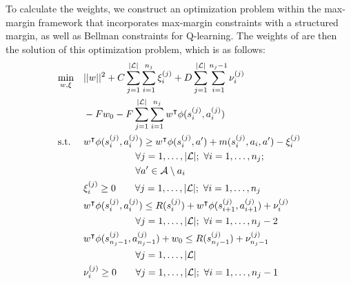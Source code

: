 To calculate the weights, we construct an optimization problem within the
max-margin framework that incorporates max-margin constraints with a structured
margin, as well as Bellman constraints for Q-learning. The weights of \approxq{}
are then the solution of this optimization problem, which is as follows:
\begin{align}
& \underset{w, \xi}{\text{min}}  & & ||\weights{}||^2 + \marginslackc{} \sum_{j=1}^{\labelsetsize{}} \sum_{i=1}^{\nsub{j}} \marginslacksubsup{i}{(j)}
                                                      + \bellmanslackc{} \sum_{j=1}^{\labelsetsize{}} \sum_{i=1}^{\nsub{j} - 1} \bellmanslacksubsup{i}{(j)} \notag \\
&    & & - \bellmanc{} \weightszero{} - \bellmanc{} \sum_{j=1}^{\labelsetsize{}} \sum_{i=1}^{\nsub{j}} \weightst{}\features{\statesubsup{i}{(j)}}{\actionsubsup{i}{(j)}}\\
& \text{s.t.} & &\weightst{} \features{\statesubsup{i}{(j)}}{\actionsubsup{i}{(j)}} \geq \weightst{} \phi(\statesubsup{i}{(j)}, \actionvar{}') + \marginvar{}(\statesubsup{i}{(j)}, \actionsub{i}, \actionvar{}') - \marginslacksubsup{i}{(j)} \notag\\
    &&&\hspace{1.9cm}\forall j = 1, \ldots, \labelsetsize{}; \text{ } \forall i = 1, \ldots, \nsub{j}; \notag\\
    &&&\hspace{1.9cm}\forall \actionvar{}' \in \actionset{}\setminus \actionvar{}_i  \label{eq:margin_constr}\\
&    & & \marginslacksubsup{i}{(j)} \geq 0 \hspace{0.7cm} \forall j = 1, \ldots, \labelsetsize{}; \text{ } \forall i = 1, \ldots, \nsub{j} \label{eq:margin_slacks}\\
&    & & \weightst{}\features{\statesubsup{i}{(j)}}{\actionsubsup{i}{(j)}} \leq \rewardfn{}(\statesubsup{i}{(j)}) + \weightst{}\features{\statesubsup{i+1}{(j)}}{\actionsubsup{i+1}{(j)}} + \bellmanslacksubsup{i}{(j)} \notag \\
    &&&\hspace{1.9cm} \forall j = 1, \ldots, \labelsetsize{}; \text{ } \forall i = 1, \ldots, \nsub{j} - 2 \label{eq:bellman_constr}\\
&    & & \weightst{}\features{\statesubsup{\nsub{j}-1}{(j)}}{\actionsubsup{\nsub{j}-1}{(j)}} + \weightszero \leq \rewardfn{}(\statesubsup{\nsub{j}-1}{(j)}) + \bellmanslacksubsup{\nsub{j}-1}{(j)} \notag \\
    &&&\hspace{1.9cm} \forall j = 1, \ldots, \labelsetsize{} \label{eq:bellman_goal_constr}\\
&    & & \bellmanslacksubsup{i}{(j)} \geq 0 \hspace{0.7cm} \forall j = 1, \ldots, \labelsetsize{}; \text{ } \forall i = 1, \ldots, \nsub{j} - 1 \label{eq:bellman_slack}
\end{align}

